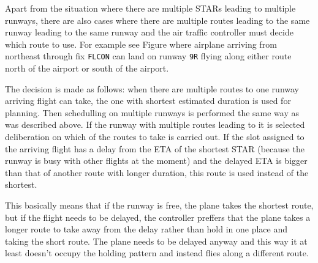 Apart from the situation where there are multiple STARs leading to multiple runways, there are also cases where there are multiple routes leading to the same runway leading to the same runway and the air traffic controller must decide which route to use. For example see Figure  where airplane arriving from northeast through fix \texttt{FLCON} can land on runway \texttt{9R} flying along either route north of the airport or south of the airport.

The decision is made as follows: when there are multiple routes to one runway arriving flight can take, the one with shortest estimated duration is used for planning. Then schedulling on multiple runways is performed the same way as was described above. If the runway with multiple routes leading to it is selected deliberation on which of the routes to take is carried out. If the slot assigned to the arriving flight has a delay from the ETA of the shortest STAR (because the runway is busy with other flights at the moment) and the delayed ETA is bigger than that of another route with longer duration, this route is used instead of the shortest.

This basically means that if the runway is free, the plane takes the shortest route, but if the flight needs to be delayed, the controller preffers that the plane takes a longer route to take away from the delay rather than hold in one place and taking the short route. The plane needs to be delayed anyway and this way it at least doesn't occupy the holding pattern and instead flies along a different route.
